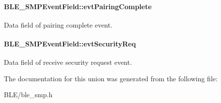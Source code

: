 \paragraph[{\texorpdfstring{evt\+Pairing\+Complete}{evtPairingComplete}}]{ B\+L\+E\+\_\+\+S\+M\+P\+Event\+Field\+::evt\+Pairing\+Complete}\hypertarget{union_b_l_e___s_m_p_event_field_a6df1a045125365c56b26a20d7c295cc4}{}\label{union_b_l_e___s_m_p_event_field_a6df1a045125365c56b26a20d7c295cc4}
Data field of pairing complete event. 
\paragraph[{\texorpdfstring{evt\+Security\+Req}{evtSecurityReq}}]{ B\+L\+E\+\_\+\+S\+M\+P\+Event\+Field\+::evt\+Security\+Req}\hypertarget{union_b_l_e___s_m_p_event_field_af79adcfa051287c00ab639d5e66a1301}{}\label{union_b_l_e___s_m_p_event_field_af79adcfa051287c00ab639d5e66a1301}
Data field of receive security request event. 

The documentation for this union was generated from the following file\+:\begin{DoxyCompactItemize}
\item 
B\+L\+E/ble\+\_\+smp.\+h\end{DoxyCompactItemize}
